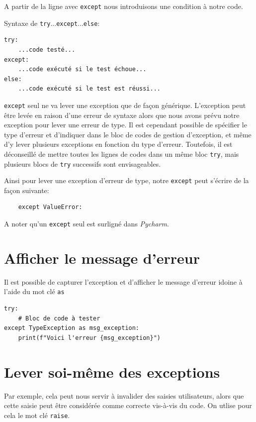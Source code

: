 \documentclass[a4paper,12pt]{book}
\begin{document}
A partir de la ligne avec \texttt{except} nous introduisons une condition à notre code.
\medskip

Syntaxe de \texttt{try}...\texttt{except}...\texttt{else}:
\begin{lstlisting}
try:
    ...code testé...
except:
    ...code exécuté si le test échoue...
else:
    ...code exécuté si le test est réussi...
\end{lstlisting}
\medskip

\texttt{except} seul ne va lever une exception que de façon générique. L'exception peut être levée en raison d'une erreur de syntaxe alors que nous avons prévu notre exception pour lever une erreur de type. Il est cependant possible de spécifier le type d'erreur et d'indiquer dans le bloc de codes de gestion d'exception, et même d'y lever plusieurs exceptions en fonction du type d'erreur. Toutefois, il est déconseillé de mettre toutes les lignes de codes dans un même bloc \texttt{try}, mais plusieurs blocs de \texttt{try} successifs sont envisageables.
\medskip

Ainsi pour lever une exception d'erreur de type, notre \texttt{except} peut s'écrire de la façon suivante:
\begin{verbatim}
    except ValueError:
\end{verbatim}
\medskip

A noter qu'un \texttt{except} seul est surligné dans \textit{Pycharm}.
\medskip

\section{Afficher le message d'erreur}
Il est possible de capturer l'exception et d'afficher le message d'erreur idoine à l'aide du mot clé \texttt{as}
\begin{lstlisting}
try:
    # Bloc de code à tester
except TypeException as msg_exception:
    print(f"Voici l'erreur {msg_exception}")
\end{lstlisting}
\medskip

\section{Lever soi-même des exceptions}
Par exemple, cela peut nous servir à invalider des saisies utilisateurs, alors que cette saisie peut être considérée comme correcte vis-à-vis du code. On utlise pour cela le mot clé \texttt{raise}.
\medskip
\end{document}
